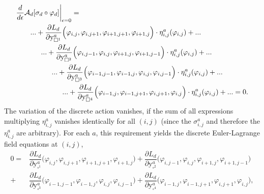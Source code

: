 \documentclass[12pt,a4paper,reqno]{article}
\begin{document}
\begin{align*}
& \dfrac{d}{d{\ensuremath{\epsilon}}} \mathcal{A}_{d} [ \sigma_{d} \circ {\ensuremath{\varphi}}_{d} ] \bigg\vert_{{\ensuremath{\epsilon}}=0} = \\
& \hspace{2em}
   ... + \dfrac{\partial L_d}{\partial {\ensuremath{{\ensuremath{\mathrm{{y}}}}}}_{\square^1}^{a}} \Big( {\ensuremath{\varphi}}_{i,  j  }, {\ensuremath{\varphi}}_{i,  j+1}, {\ensuremath{\varphi}}_{i+1,j+1}, {\ensuremath{\varphi}}_{i+1,j  } \Big) \cdot \eta_{i,j}^{a} ({\ensuremath{\varphi}}_{i,j}) + ... \\
& \hspace{3.5em}
   ... + \dfrac{\partial L_d}{\partial {\ensuremath{{\ensuremath{\mathrm{{y}}}}}}_{\square^2}^{a}} \Big( {\ensuremath{\varphi}}_{i,  j-1}, {\ensuremath{\varphi}}_{i,  j  }, {\ensuremath{\varphi}}_{i+1,j  }, {\ensuremath{\varphi}}_{i+1,j-1} \Big) \cdot \eta_{i,j}^{a} ({\ensuremath{\varphi}}_{i,j}) + ... \\
& \hspace{5em}
   ... + \dfrac{\partial L_d}{\partial {\ensuremath{{\ensuremath{\mathrm{{y}}}}}}_{\square^3}^{a}} \Big( {\ensuremath{\varphi}}_{i-1,j-1}, {\ensuremath{\varphi}}_{i-1,j  }, {\ensuremath{\varphi}}_{i,  j  }, {\ensuremath{\varphi}}_{i,  j-1} \Big) \cdot \eta_{i,j}^{a} ({\ensuremath{\varphi}}_{i,j}) + ... \\
& \hspace{6.5em}
   ... + \dfrac{\partial L_d}{\partial {\ensuremath{{\ensuremath{\mathrm{{y}}}}}}_{\square^4}^{a}} \Big( {\ensuremath{\varphi}}_{i-1,j  }, {\ensuremath{\varphi}}_{i-1,j+1}, {\ensuremath{\varphi}}_{i,  j+1}, {\ensuremath{\varphi}}_{i,  j  } \Big) \cdot \eta_{i,j}^{a} ({\ensuremath{\varphi}}_{i,j}) + ...
= 0 .
\end{align*}
The variation of the discrete action vanishes, if the sum of all expressions multiplying $\eta_{i,j}^{a}$ vanishes identically for all $(i,j)$ (since the $\sigma_{i,j}^{a}$ and therefore the $\eta_{i,j}^{a}$ are arbitrary). For each $a$, this requirement yields the discrete Euler-Lagrange field equations at $(i,j)$,
\begin{align}\label{eq:vi_discrete_euler_lagrange_equations}
\nonumber
0= & {\dfrac{\partial L_d}{\partial {\ensuremath{{\ensuremath{\mathrm{{y}}}}}}_{\square^1}^{a}} \Big( {\ensuremath{\varphi}}_{i,  j  }, {\ensuremath{\varphi}}_{i,  j+1}, {\ensuremath{\varphi}}_{i+1,j+1}, {\ensuremath{\varphi}}_{i+1,j  } \Big)}
 +   {\dfrac{\partial L_d}{\partial {\ensuremath{{\ensuremath{\mathrm{{y}}}}}}_{\square^2}^{a}} \Big( {\ensuremath{\varphi}}_{i,  j-1}, {\ensuremath{\varphi}}_{i,  j  }, {\ensuremath{\varphi}}_{i+1,j  }, {\ensuremath{\varphi}}_{i+1,j-1} \Big)} \\
 + & {\dfrac{\partial L_d}{\partial {\ensuremath{{\ensuremath{\mathrm{{y}}}}}}_{\square^3}^{a}} \Big( {\ensuremath{\varphi}}_{i-1,j-1}, {\ensuremath{\varphi}}_{i-1,j  }, {\ensuremath{\varphi}}_{i,  j  }, {\ensuremath{\varphi}}_{i,  j-1} \Big)}
 +   {\dfrac{\partial L_d}{\partial {\ensuremath{{\ensuremath{\mathrm{{y}}}}}}_{\square^4}^{a}} \Big( {\ensuremath{\varphi}}_{i-1,j  }, {\ensuremath{\varphi}}_{i-1,j+1}, {\ensuremath{\varphi}}_{i,  j+1}, {\ensuremath{\varphi}}_{i,  j  } \Big)} ,
\end{align}
\end{document}
